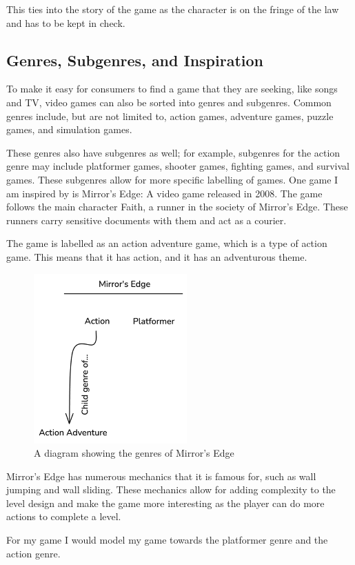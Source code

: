 \documentclass[12pt]{article}
\begin{document}
	This ties into the story of the game as the character is on the fringe of the law and has to be kept in check.
	
	\subsection{Genres, Subgenres, and Inspiration}
	To make it easy for consumers to find a game that they are seeking, like songs and TV, video games can also be sorted into genres and subgenres. Common genres include, but are not limited to, action games, adventure games, puzzle games, and simulation games.
	
	These genres also have subgenres as well; for example, subgenres for the action genre may include platformer games, shooter games, fighting games, and survival games. These subgenres allow for more specific labelling of games.
	\newpage
	One game I am inspired by is Mirror’s Edge: A video game released in 2008. The game follows the main character Faith, a runner in the society of Mirror’s Edge. These runners carry sensitive documents with them and act as a courier. \cite{mirrorsEdgeGamespot}
	
	The game is labelled as an action adventure game, which is a type of action game. This means that it has action, and it has an adventurous theme.
	
	\begin{figure}[h]
		\includegraphics{mirrorsEdgeGenres}
		\centering
		\caption{A diagram showing the genres of Mirror's Edge}
	\end{figure}
	
	Mirror’s Edge has numerous mechanics that it is famous for, such as wall jumping and wall sliding. These mechanics allow for adding complexity to the level design and make the game more interesting as the player can do more actions to complete a level.
	
	For my game I would model my game towards the platformer genre and the action genre.
	
\end{document}
